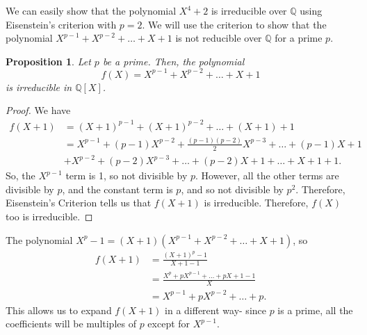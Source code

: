 \documentclass[a4paper, openany]{memoir}
\theoremstyle{definition}
\theoremstyle{plain}
\newtheorem{proposition}[definition]{Proposition}
\begin{document}
\noindent We can easily show that the polynomial $X^4 + 2$ is irreducible over $\mathbb{Q}$ using Eisenstein's criterion with $p = 2$. We will use the criterion to show that the polynomial $X^{p-1} + X^{p-2} + \dots + X + 1$ is not reducible over $\mathbb{Q}$ for a prime $p$.
\begin{proposition}
Let $p$ be a prime. Then, the polynomial
\[f(X) = X^{p-1} + X^{p-2} + \dots + X + 1\]
is irreducible in $\mathbb{Q}[X]$.
\end{proposition}
\begin{proof}
We have
\begin{align*}
    f(X+1) &= (X+1)^{p-1} + (X+1)^{p-2} + \dots + (X+1) + 1 \\
    &= X^{p-1} + (p-1)X^{p-2} + \frac{(p-1)(p-2)}{2}X^{p-3} + \dots + (p-1)X + 1 \\
    &+ X^{p-2} + (p-2)X^{p-3} + \dots + (p-2)X + 1 + \dots + X + 1 + 1.
\end{align*}
So, the $X^{p-1}$ term is 1, so not divisible by $p$. However, all the other terms are divisible by $p$, and the constant term is $p$, and so not divisible by $p^2$. Therefore, Eisenstein's Criterion tells us that $f(X+1)$ is irreducible. Therefore, $f(X)$ too is irreducible.
\end{proof}
\noindent The polynomial $X^p - 1 = (X+1)(X^{p-1} + X^{p-2} + \dots + X + 1)$, so
\begin{align*}
    f(X+1) &= \frac{(X+1)^p - 1}{X+1-1} \\
    &= \frac{X^{p} + pX^{p-1} + \dots + pX + 1 - 1}{X} \\
    &= X^{p-1} + pX^{p-2} + \dots + p.
\end{align*}
This allows us to expand $f(X+1)$ in a different way- since $p$ is a prime, all the coefficients will be multiples of $p$ except for $X^{p-1}$.
\end{document}
